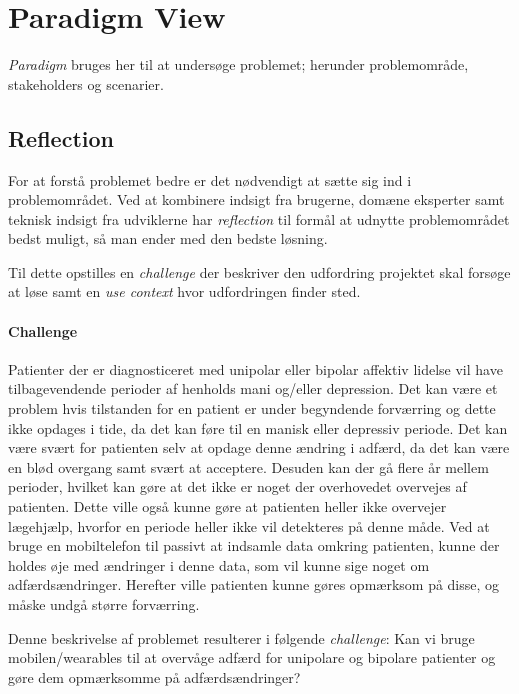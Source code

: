

\section{Paradigm View}
\textit{Paradigm} bruges her til at undersøge problemet; herunder problemområde, stakeholders og scenarier.

\subsection{Reflection}
For at forstå problemet bedre er det nødvendigt at sætte sig ind i problemområdet.
Ved at kombinere indsigt fra brugerne, domæne eksperter samt teknisk indsigt fra udviklerne har \emph{reflection} til formål at udnytte problemområdet bedst muligt, så man ender med den bedste løsning.

Til dette opstilles en \emph{challenge} der beskriver den udfordring projektet skal forsøge at løse samt en \emph{use context} hvor udfordringen finder sted.

\paragraph{Challenge}\label{paradigm:challenge}
Patienter der er diagnosticeret med unipolar eller bipolar affektiv lidelse vil have tilbagevendende perioder af henholds mani og/eller depression.
Det kan være et problem hvis tilstanden for en patient er under begyndende forværring og dette ikke opdages i tide, da det kan føre til en manisk eller depressiv periode.
Det kan være svært for patienten selv at opdage denne ændring i adfærd, da det kan være en blød overgang samt svært at acceptere.
Desuden kan der gå flere år mellem perioder, hvilket kan gøre at det ikke er noget der overhovedet overvejes af patienten.
Dette ville også kunne gøre at patienten heller ikke overvejer lægehjælp, hvorfor en periode heller ikke vil detekteres på denne måde.
Ved at bruge en mobiltelefon til passivt at indsamle data omkring patienten, kunne der holdes øje med ændringer i denne data, som vil kunne sige noget om adfærdsændringer.
Herefter ville patienten kunne gøres opmærksom på disse, og måske undgå større forværring.

Denne beskrivelse af problemet resulterer i følgende \emph{challenge}:
Kan vi bruge mobilen/wearables til at overvåge adfærd for unipolare og bipolare patienter og gøre dem opmærksomme på adfærdsændringer?

